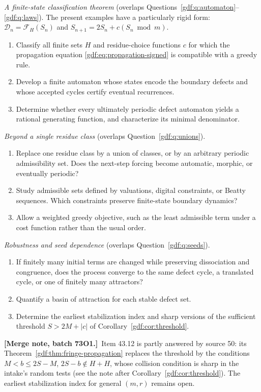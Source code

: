 \documentclass[11pt,a4paper]{article}
\numberwithin{equation}{section}
\theoremstyle{definition}
\theoremstyle{remark}
\theoremstyle{plain}
\newcommand{\cD}{\mathcal D}
\newcommand{\cF}{\mathcal F}
\newcommand{\mergenote}[1]{\par\smallskip\noindent\textbf{[Merge note, batch 73O1.]}\ #1\par\smallskip}
\begin{document}
\emph{A finite-state classification theorem} (overlaps
Questions~\ref{gdf:q:automaton}--\ref{gdf:q:laws}).  The present examples
have a particularly rigid form: $\cD_n=\cF_H(S_n)$ and
$S_{n+1}=2S_n+c(S_n\bmod m)$.
\begin{enumerate}[label=43.\arabic*,resume]
\item Classify all finite sets $H$ and residue-choice functions $c$ for which
      the propagation equation \eqref{gdf:eq:propagation-signed} is
      compatible with a greedy rule.
\item Develop a finite automaton whose states encode the boundary defects and
      whose accepted cycles certify eventual recurrences.
\item Determine whether every ultimately periodic defect automaton yields a
      rational generating function, and characterize its minimal denominator.
\end{enumerate}

\emph{Beyond a single residue class} (overlaps
Question~\ref{gdf:q:unions}).
\begin{enumerate}[label=43.\arabic*,resume]
\item Replace one residue class by a union of classes, or by an arbitrary
      periodic admissibility set.  Does the next-step forcing become
      automatic, morphic, or eventually periodic?
\item Study admissible sets defined by valuations, digital constraints, or
      Beatty sequences.  Which constraints preserve finite-state boundary
      dynamics?
\item Allow a weighted greedy objective, such as the least admissible term
      under a cost function rather than the usual order.
\end{enumerate}

\emph{Robustness and seed dependence} (overlaps
Question~\ref{gdf:q:seeds}).
\begin{enumerate}[label=43.\arabic*,resume]
\item If finitely many initial terms are changed while preserving dissociation
      and congruence, does the process converge to the same defect cycle, a
      translated cycle, or one of finitely many attractors?
\item Quantify a basin of attraction for each stable defect set.
\item Determine the earliest stabilization index and sharp versions of the
      sufficient threshold $S>2M+|c|$ of Corollary~\ref{gdf:cor:threshold}.
\end{enumerate}
\mergenote{Item 43.12 is partly answered by source 50: its
Theorem~\ref{gdf:thm:fringe-propagation} replaces the threshold by the
conditions $M<b\le2S-M$, $2S-b\notin H+H$, whose collision condition is
sharp in the intake's random tests (see the note after
Corollary~\ref{gdf:cor:threshold}).  The
earliest stabilization index for general $(m,r)$ remains open.}
\end{document}

